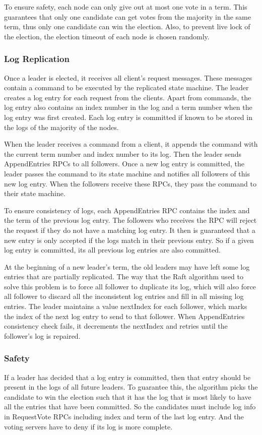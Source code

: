 \documentclass[12pt, a4paper]{article}
\begin{document}
  To ensure safety, each node can only give out at most one vote in a term. This guarantees that only one candidate can get votes from
  the majority in the same term, thus only one candidate can win the election. Also, to prevent live lock of the election, the election
  timeout of each node is chosen randomly.

  \subsubsection{Log Replication}
  Once a leader is elected, it receives all client's request messages. These messages contain a command to be executed by the replicated
  state machine. The leader creates a log entry for each request from the clients. Apart from commands, the log entry also contains an index
  number in the log and a term number when the log entry was first created. Each log entry is committed if known to be stored in the logs of
  the majority of the nodes.

  When the leader receives a command from a client, it appends the command with the current term number and index number to its log. Then the leader
  sends AppendEntries RPCs to all followers. Once a new log entry is committed, the leader passes the command to its state machine and
  notifies all followers of this new log entry. When the followers receive these RPCs, they pass the command to their state machine.

  To ensure consistency of logs, each AppendEntries RPC contains the index and the term of the previous log entry. The followers who receives the RPC will
  reject the request if they do not have a matching log entry. It then is guaranteed that a new entry is only accepted if the logs match in
  their previous entry. So if a given log entry is committed, its all previous log entries are also committed.

  At the beginning of a new leader's term, the old leaders may have left some log entries that are partially replicated. The way that the Raft
  algorithm used to solve this problem is to force all follower to duplicate its log, which will also force all follower to discard all the
  inconsistent log entries and fill in all missing log entries. The leader maintains a value nextIndex for each follower, which marks the index
  of the next log entry to send to that follower. When AppendEntries consistency check fails, it decrements the nextIndex and retries until the
  follower's log is repaired.

  \subsubsection{Safety}
  If a leader has decided that a log entry is committed, then that entry should be present in the logs of all future leaders\cite{conf/usenix/OngaroO14}. To guarantee this,
  the algorithm picks the candidate to win the election such that it has the log that is most likely to have all the entries that have been
  committed. So the candidates must include log info in RequestVote RPCs including index and term of the last log entry. And the voting servers
  have to deny if its log is more complete.
\end{document}
